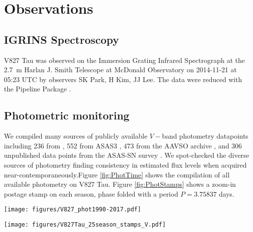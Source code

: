 \documentclass[twocolumn]{emulateapj}%
\begin{document}
\section{Observations}\label{sec:obs}

\subsection{IGRINS Spectroscopy}\label{sec:igrins}

V827 Tau was observed on the Immersion Grating Infrared Spectrograph \citep[IGRINS]{park14} at the 2.7~m Harlan J. Smith Telescope at McDonald Observatory on 2014-11-21 at 05:23 UTC by observers SK Park, H Kim, JJ Lee.  The data were reduced with the Pipeline Package \citep{jaejoonlee15}.

\subsection{Photometric monitoring}

We compiled many sources of publicly available $V-$band photometry datapoints including 236 from \citep{grankin08}, 552 from ASAS3 \citep{pojmanski04}, 473 from the AAVSO archive \citep{kafka16}, and 306 unpublished data points from the ASAS-SN survey \citep{shappee14}.  We spot-checked the diverse sources of photometry finding consistency in estimated flux levels when acquired near-contemporaneously.Figure \ref{fig:PhotTime} shows the compilation of all available photometry on V827 Tau.  Figure \ref{fig:PhotStamps} shows a zoom-in postage stamp on each season, phase folded with a period $P=3.75837$ days.

\begin{figure*}
 \centering
 \texttt{[image: figures/V827\_phot1990-2017.pdf]}
 \caption{Compilation of archival and new flux measurements in $V-$band for V827 Tau, normalized to the global maximum flux value, which occurred in 1990.  The y-axis equals the minimum starspot area, when flux deficits are interpreted with the simplest possible analytic starspot model.}
 \label{fig:PhotTime}
\end{figure*}

\begin{figure*}
 \centering
 \texttt{[image: figures/V827Tau\_25season\_stamps\_V.pdf]}
 \caption{Phase-folded $V-$band flux measurements of V827 Tau grouped into 25 observing seasons, and normalized to the global maximum in 1990.  The y-axis equals the minimum starspot area, when flux deficits are interpreted with the simplest possible analytic starspot model.}
 \label{fig:PhotStamps}
\end{figure*}
\end{document}
